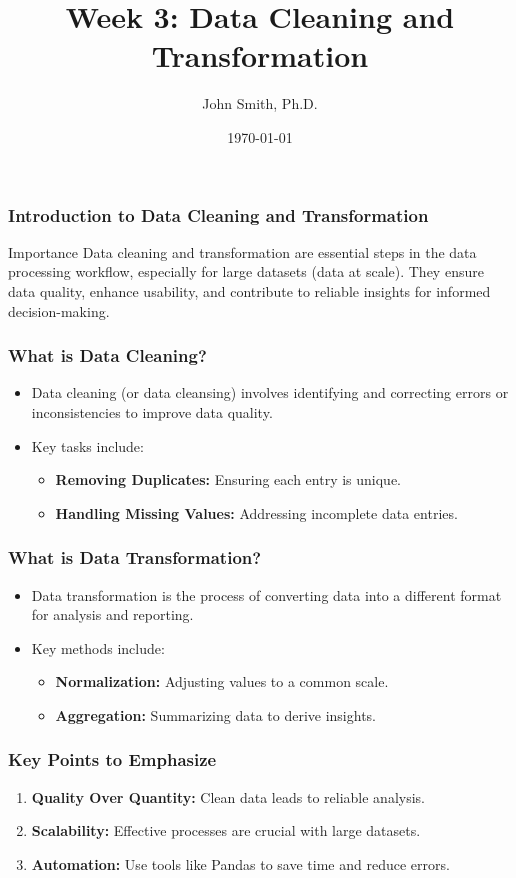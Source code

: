 \documentclass[aspectratio=169]{beamer}
\title[Week 3: Data Cleaning and Transformation]{Week 3: Data Cleaning and Transformation}
\author[J. Smith]{John Smith, Ph.D.}
\institute[University Name]{
  Department of Computer Science\\
  University Name\\
  \vspace{0.3cm}
  Email: email@university.edu\\
  Website: www.university.edu
}
\date{\today}
\begin{document}
\frame{\titlepage}

\begin{frame}[fragile]
    \frametitle{Introduction to Data Cleaning and Transformation}
    \begin{block}{Importance}
        Data cleaning and transformation are essential steps in the data processing workflow, especially for large datasets (data at scale). They ensure data quality, enhance usability, and contribute to reliable insights for informed decision-making.
    \end{block}
\end{frame}

\begin{frame}[fragile]
    \frametitle{What is Data Cleaning?}
    \begin{itemize}
        \item Data cleaning (or data cleansing) involves identifying and correcting errors or inconsistencies to improve data quality.
        \item Key tasks include:
        \begin{itemize}
            \item \textbf{Removing Duplicates:} Ensuring each entry is unique.
            \item \textbf{Handling Missing Values:} Addressing incomplete data entries.
        \end{itemize}
    \end{itemize}
\end{frame}

\begin{frame}[fragile]
    \frametitle{What is Data Transformation?}
    \begin{itemize}
        \item Data transformation is the process of converting data into a different format for analysis and reporting.
        \item Key methods include:
        \begin{itemize}
            \item \textbf{Normalization:} Adjusting values to a common scale.
            \item \textbf{Aggregation:} Summarizing data to derive insights.
        \end{itemize}
    \end{itemize}
\end{frame}

\begin{frame}[fragile]
    \frametitle{Key Points to Emphasize}
    \begin{enumerate}
        \item \textbf{Quality Over Quantity:} Clean data leads to reliable analysis.
        \item \textbf{Scalability:} Effective processes are crucial with large datasets.
        \item \textbf{Automation:} Use tools like Pandas to save time and reduce errors.
    \end{enumerate}
\end{frame}
\end{document}
